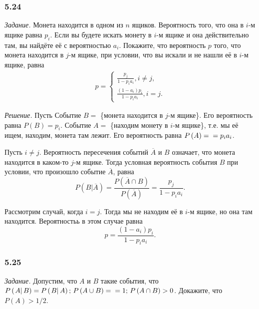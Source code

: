 \subsubsection*{5.24}

\textit{Задание.} Монета находится в одном из $n$ ящиков.
Вероятность того, что она в $i$-м ящике равна $p_i$.
Если вы будете искать монету в $i$-м ящике и она действительно там, вы найдёте её с вероятностью $a_i$.
Покажите, что вероятность $p$ того, что монета находится в $j$-м ящике, при условии, что вы искали и не нашли её в $i$-м ящике, равна
\begin{equation*}
\begin{split}
p =
\begin{cases}
\frac{p_j}{1-p_i a_i}, i \neq j, \\
\frac{ \left( 1-a_i \right) p_i}{1-p_i a_i}, i = j.
\end{cases}
\end{split}
\end{equation*}

\textit{Решение.} Пусть Событие $B = $ \{монета находится в $j$-м ящике\}.
Его вероятность равна $P \left( B \right) = p_i$.
Событие $A =$ \{находим монету в $i$-м ящике\}, т.е. мы её ищем, находим, монета там лежит.
Его вероятность равна $P \left( A \right) = \\ = p_i a_i$.

Пусть $i \neq j$.
Вероятность пересечения событий $ \overline{A}$ и $B$ означает, что монета находится в каком-то $j$-м ящике.
Тогда условная вероятность события $B$ при условии, что произошло событие $ \overline{A}$, равна
$$P \left( \left. B \right| \overline{A} \right) =
\frac{P \left( \overline{A} \cap B \right) }{P \left( \overline{A} \right) } =
\frac{p_j}{1-p_i a_i}.$$

Рассмотрим случай, когда $i = j$.
Тогда мы не находим её в $i$-м ящике, но она там находится.
Вероятностьь в этом случае равна
$$p =
\frac{ \left( 1-a_i \right) p_i}{1-p_i a_i}.$$

\subsubsection*{5.25}

\textit{Задание.} Допустим, что $A$ и $B$ такие события, что
$P \left( \left. A \right| B \right) = P \left( \left. B \right| A \right); \,
P \left( A \cup B \right) = \\
= 1; \,
P \left( A \cap B \right) > 0$.
Докажите, что $P \left( A \right) > 1/2$.

